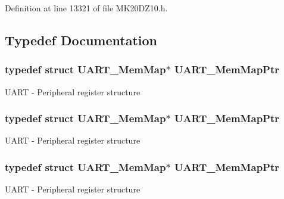 Definition at line 13321 of file M\+K20\+D\+Z10.\+h.



\subsection{Typedef Documentation}
\subsubsection[{\texorpdfstring{U\+A\+R\+T\+\_\+\+Mem\+Map\+Ptr}{UART_MemMapPtr}}]{\setlength{\rightskip}{0pt plus 5cm}typedef struct {\bf U\+A\+R\+T\+\_\+\+Mem\+Map}$\ast$ {\bf U\+A\+R\+T\+\_\+\+Mem\+Map\+Ptr}}\hypertarget{group___u_a_r_t___peripheral_ga306cf44b593fadbb29a065f42e3f68f0}{}\label{group___u_a_r_t___peripheral_ga306cf44b593fadbb29a065f42e3f68f0}
U\+A\+RT -\/ Peripheral register structure 
\subsubsection[{\texorpdfstring{U\+A\+R\+T\+\_\+\+Mem\+Map\+Ptr}{UART_MemMapPtr}}]{\setlength{\rightskip}{0pt plus 5cm}typedef struct {\bf U\+A\+R\+T\+\_\+\+Mem\+Map}$\ast$ {\bf U\+A\+R\+T\+\_\+\+Mem\+Map\+Ptr}}\hypertarget{group___u_a_r_t___peripheral_ga306cf44b593fadbb29a065f42e3f68f0}{}\label{group___u_a_r_t___peripheral_ga306cf44b593fadbb29a065f42e3f68f0}
U\+A\+RT -\/ Peripheral register structure 
\subsubsection[{\texorpdfstring{U\+A\+R\+T\+\_\+\+Mem\+Map\+Ptr}{UART_MemMapPtr}}]{\setlength{\rightskip}{0pt plus 5cm}typedef struct {\bf U\+A\+R\+T\+\_\+\+Mem\+Map}$\ast$ {\bf U\+A\+R\+T\+\_\+\+Mem\+Map\+Ptr}}\hypertarget{group___u_a_r_t___peripheral_ga306cf44b593fadbb29a065f42e3f68f0}{}\label{group___u_a_r_t___peripheral_ga306cf44b593fadbb29a065f42e3f68f0}
U\+A\+RT -\/ Peripheral register structure 